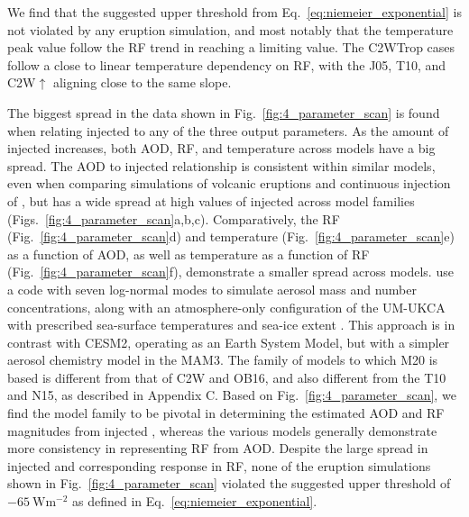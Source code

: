 \documentclass[draft]{agujournal2019}
\newcommand{\iso}[1][i]{{#1}njected \ce{SO2}}
\newcommand{\cw}{C2W}
\newcommand{\cwt}{C2WTrop}
\newcommand{\cwsn}{C2W\(\uparrow\)}
\begin{document}
We find that the suggested upper threshold from Eq.~\ref{eq:niemeier_exponential} is not
violated by any eruption simulation, and most notably that the temperature peak value
follow the RF trend in reaching a limiting value. The \cwt{} cases follow a close to
linear temperature dependency on RF, with the J05, T10, and \cwsn{} aligning close to
the same slope.

The biggest spread in the data shown in Fig.~\ref{fig:4_parameter_scan} is found when
relating \iso{} to any of the three output parameters. As the amount of \iso{}
increases, both AOD, RF, and temperature across models have a big spread. The AOD to
\iso{} relationship is consistent within similar models, even when comparing simulations
of volcanic eruptions \cite{timmreck2010} and continuous injection of 
\cite{niemeier2015}, but has a wide spread at high values of \iso{} across model
families (Figs.~\ref{fig:4_parameter_scan}a,b,c). Comparatively, the RF
(Fig.~\ref{fig:4_parameter_scan}d) and temperature (Fig.~\ref{fig:4_parameter_scan}e) as
a function of AOD, as well as temperature as a function of RF
(Fig.~\ref{fig:4_parameter_scan}f), demonstrate a smaller spread across models.
 use a code with seven log-normal modes
to simulate aerosol mass and number concentrations, along with an atmosphere-only
configuration of the UM-UKCA with prescribed sea-surface temperatures and sea-ice extent
\cite{marshall2019}. This approach is in contrast with CESM2, operating as an Earth
System Model, but with a simpler aerosol chemistry model in the MAM3. The family of
models to which M20 is based is different from that of \cw{} and OB16, and also
different from the T10 and N15, as described in Appendix C. Based on
Fig.~\ref{fig:4_parameter_scan}, we find the model family to be pivotal in determining
the estimated AOD and RF magnitudes from \iso{}, whereas the various models generally
demonstrate more consistency in representing RF from AOD. Despite the large spread in
\iso{} and corresponding response in RF, none of the eruption simulations shown in
Fig.~\ref{fig:4_parameter_scan} violated the suggested upper threshold of
\(\SI{-65}{\watt\metre^{-2}}\) as defined in Eq.~\ref{eq:niemeier_exponential}.
\end{document}
